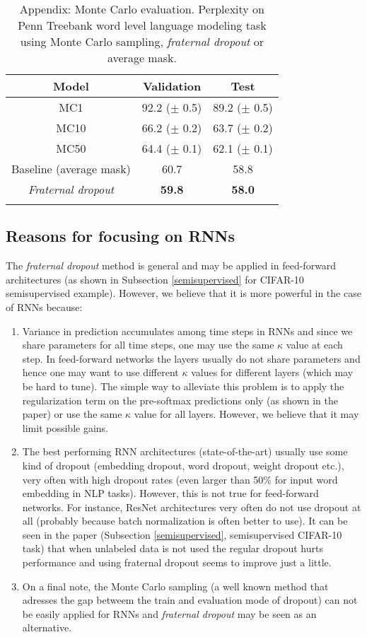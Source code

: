 \documentclass{article} %
\begin{document}
\begin{table}[ht]
\vspace{-0.08cm}
\centering
\begin{tabular}{c | c c} 
\textbf{Model} & \textbf{Validation} & \textbf{Test}\\
\hline
MC1 & 92.2 ($\pm$ 0.5) & 89.2 ($\pm$ 0.5)\\
MC10 & 66.2 ($\pm$ 0.2) & 63.7 ($\pm$ 0.2)\\
MC50 & 64.4 ($\pm$ 0.1) & 62.1 ($\pm$ 0.1)\\
Baseline (average mask) & 60.7 & 58.8\\
\emph{Fraternal dropout} & \textbf{59.8} & \textbf{58.0}\\
\vspace{-0.08cm}
\end{tabular}
\caption{Appendix: Monte Carlo evaluation. Perplexity on Penn Treebank word level language modeling task using Monte Carlo sampling, \emph{fraternal dropout} or average mask.}
\label{table:MC-eval}
\end{table}

\newpage
\subsection*{Reasons for focusing on RNNs}
The \emph{fraternal dropout} method is general and may be applied in feed-forward architectures (as shown in Subsection \ref{semisupervised} for CIFAR-10 semisupervised example). However, we believe that it is more powerful in the case of RNNs because:
\begin{enumerate}
\item Variance in prediction accumulates among time steps in RNNs and since we share parameters for all time steps, one may use the same $\kappa$ value at each step. In feed-forward networks the layers usually do not share parameters and hence one may want to use different $\kappa$  values for different layers (which may be hard to tune). The simple way to alleviate this problem is to apply the regularization term on the pre-softmax predictions only (as shown in the paper) or use the same $\kappa$  value for all layers. However, we believe that it may limit possible gains.
\item The best performing RNN architectures (state-of-the-art) usually use some kind of dropout (embedding dropout, word dropout, weight dropout etc.), very often with high dropout rates (even larger than 50\% for input word embedding in NLP tasks). However, this is not true for feed-forward networks. For instance, ResNet architectures very often do not use dropout at all (probably because batch normalization is often better to use). It can be seen in the paper (Subsection \ref{semisupervised}, semisupervised CIFAR-10 task) that when unlabeled data is not used the regular dropout hurts performance and using fraternal dropout seems to improve just a little.
\item On a final note, the Monte Carlo sampling (a well known method that adresses the gap betweem the train and evaluation mode of dropout) can not be easily applied for RNNs and \emph{fraternal dropout} may be seen as an alternative.
\end{enumerate}
\end{document}
